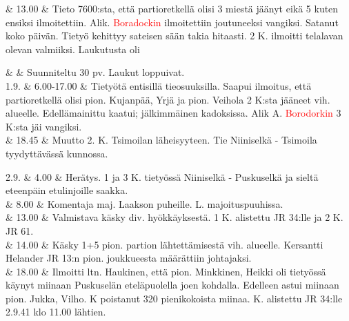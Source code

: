 \documentclass[11pt,a5paper,oneside]{book}
\begin{document}
& 13.00 & Tieto 7600:sta, että partioretkellä olisi 3 miestä jäänyt eikä 5 kuten ensiksi ilmoitettiin. Alik. \textcolor{red}{Boradockin} ilmoitettiin joutuneeksi vangiksi. \newline Satanut koko päivän. Tietyö kehittyy sateisen sään takia hitaasti. 2 K. ilmoitti telalavan olevan valmiiksi. Laukutusta oli \\ 
\taulustop


& & Suunniteltu 30 pv. Laukut loppuivat. \newline\newline \\

1.9. & 6.00-17.00 & Tietyötä entisillä tieosuuksilla. \newline Saapui ilmoitus, että partioretkellä olisi pion. Kujanpää, Yrjä ja pion. Veihola 2 K:sta jääneet vih. alueelle. Edellämainittu kaatui; jälkimmäinen kadoksissa. Alik A. \textcolor{red}{Borodorkin} 3 K:sta jäi vangiksi. \newline \\

& 18.45 & Muutto 2. K. Tsimoilan läheisyyteen. Tie Niiniselkä - Tsimoila tyydyttävässä kunnossa. \\
\newpage

2.9. & 4.00 & Herätys. 1 ja 3 K. tietyössä Niiniselkä - Puskuselkä ja sieltä eteenpäin etulinjoille saakka. \newline \\

& 8.00 & Komentaja maj. Laakson puheille.  L. majoituspuuhissa. \newline \\

& 13.00 & Valmistava käsky div. hyökkäyksestä. 1 K. alistettu JR 34:lle ja 2 K. JR 61. \newline \\

& 14.00 & Käsky 1+5 pion. partion lähtettämisestä vih. alueelle. Kersantti Helander JR 13:n pion. joukkueesta määrättiin johtajaksi. \newline \\

& 18.00 & Ilmoitti ltn. Haukinen, että pion. Minkkinen, Heikki oli tietyössä käynyt miinaan Puskuselän eteläpuolella joen kohdalla. Edelleen astui miinaan pion. Jukka, Vilho.  K poistanut 320 pienikokoista miinaa.  K. alistettu JR 34:lle 2.9.41 klo 11.00 lähtien. \\
\end{document}
